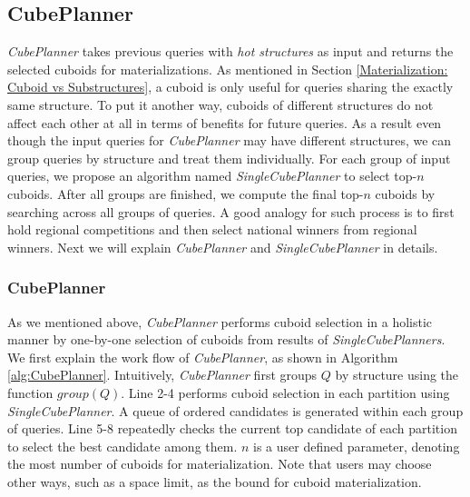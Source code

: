 	\subsection{CubePlanner}
	\label{sec:CubePlanner}
	
	\emph{CubePlanner} takes previous queries with \emph{hot structures} as input and returns the selected cuboids for materializations. As mentioned in Section \ref{Materialization: Cuboid vs Substructures}, a cuboid is only useful for queries sharing the exactly same structure. To put it another way, cuboids of different structures do not affect each other at all in terms of benefits for future queries. As a result even though the input queries for \emph{CubePlanner} may have different structures, we can group queries by structure and treat them individually. For each group of input queries, we propose an algorithm named \emph{SingleCubePlanner} to select top-$n$ cuboids. After all groups are finished, we compute the final top-$n$ cuboids by searching across all groups of queries. A good analogy for such process is to first hold regional competitions and then select national winners from regional winners. Next we will explain \emph{CubePlanner} and \emph{SingleCubePlanner} in details.
	
	\subsubsection{CubePlanner}
	\label{CubePlanner}
	
	As we mentioned above, \emph{CubePlanner} performs cuboid selection in a holistic manner by one-by-one selection of cuboids from results of \emph{SingleCubePlanners}. We first explain the work flow of \emph{CubePlanner}, as shown in Algorithm \ref{alg:CubePlanner}. %
	Intuitively, \emph{CubePlanner} first groups $Q$ by structure using the function $group(Q)$. Line 2-4 performs cuboid selection in each partition using \emph{SingleCubePlanner}. A queue of ordered candidates is generated within each group of queries. Line 5-8 repeatedly checks the current top candidate of each partition to select the best candidate among them. $n$ is a user defined parameter, denoting the most number of cuboids for materialization.  Note that users may choose other ways, such as a space limit, as the bound for cuboid materialization.
	
